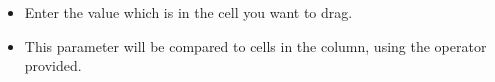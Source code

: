 
\begin{itemize}
\item Enter the value which is in the cell you want to drag.
\item This parameter will be compared to cells in the column, using the operator provided.
\end{itemize}
